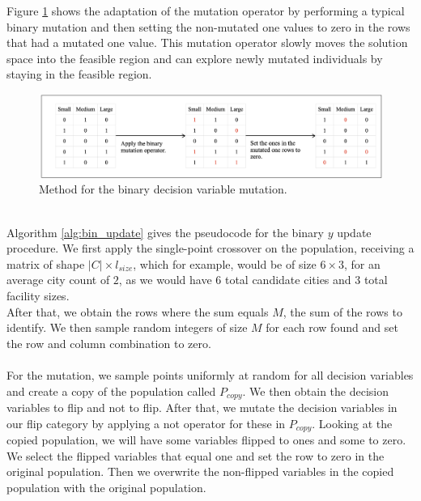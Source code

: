 \documentclass[mscthesis, 11pt]{usiinfthesis}
\theoremstyle{newdefinition}
\begin{document}
Figure \ref{fig:binary_mutation} shows the adaptation of the mutation operator by performing a typical binary mutation and then setting the non-mutated one values to zero in the rows that had a mutated one value. This mutation operator slowly moves the solution space into the feasible region and can explore newly mutated individuals by staying in the feasible region. 
\begin{figure}[ht]
    \centering
    \includegraphics[width=\linewidth]{methodology/binary_mutation_operator.png}
    \caption{Method for the binary decision variable mutation.}
    \label{fig:binary_mutation}
\end{figure}
\\
Algorithm \ref{alg:bin_update} gives the pseudocode for the binary $y$ update procedure. We first apply the single-point crossover on the population, receiving a matrix of shape $|C| \times l_{size}$, which for example, would be of size $6 \times 3$, for an average city count of $2$, as we would have $6$ total candidate cities and $3$ total facility sizes. \\
After that, we obtain the rows where the sum equals $M$, the sum of the rows to identify. We then sample random integers of size $M$ for each row found and set the row and column combination to zero.
\\\\
For the mutation, we sample points uniformly at random for all decision variables and create a copy of the population called $P_{copy}$. We then obtain the decision variables to flip and not to flip. After that, we mutate the decision variables in our flip category by applying a not operator for these in $P_{copy}$. Looking at the copied population, we will have some variables flipped to ones and some to zero. We select the flipped variables that equal one and set the row to zero in the original population. Then we overwrite the non-flipped variables in the copied population with the original population.
\end{document}
